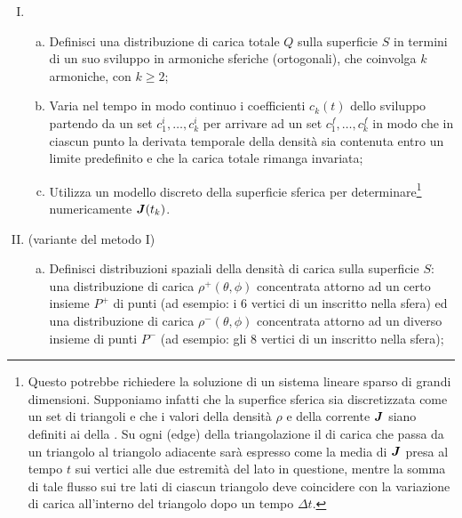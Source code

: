 \begin{enumerate}[(I)]
\item {} 
	\begin{enumerate}[(a)]
	\item Definisci una distribuzione di carica totale $Q$ sulla superficie $S$ in termini di un  suo sviluppo in armoniche sferiche (ortogonali), che coinvolga $k$ armoniche, con $k \geq 2$;  
	\item Varia nel tempo in modo continuo i coefficienti $c_k(t)$ dello sviluppo partendo da un set  $c^{i}_1, \ldots, c^{i}_k$ per arrivare ad un set  $c^{f}_1, \ldots, c^{f}_k$ in modo che in ciascun punto la derivata temporale della densità sia contenuta entro un limite predefinito e che la carica totale rimanga invariata;
	\item Utilizza un modello discreto della superficie sferica per determinare\footnote{Questo potrebbe richiedere la soluzione di un sistema lineare sparso di grandi dimensioni. Supponiamo infatti che la superfice sferica sia discretizzata come un set di triangoli e che i valori della densità $\rho$ e della corrente $\vb*{J}$ siano definiti ai  della . Su ogni  (edge) della triangolazione il  di carica che passa da un triangolo al triangolo adiacente sarà espresso come la media di $\vb*{J}$ presa al tempo $t$ sui vertici alle due estremità del lato in questione, mentre la somma di tale flusso sui tre lati di ciascun triangolo deve coincidere con la variazione di carica all'interno del triangolo dopo un tempo $\Delta t$.} numericamente $\vb*{J}(t_k)$.
	\end{enumerate}
\item {} (variante del metodo I) 
	\begin{enumerate}[(a)]
	\item Definisci  distribuzioni spaziali della densità di carica sulla superficie $S$: una distribuzione di carica  $\rho^+(\theta, \phi)$ concentrata attorno ad un certo insieme $P^+$ di punti (ad esempio: i $6$ vertici di un   inscritto nella sfera) ed una distribuzione di carica  $\rho^-(\theta, \phi)$ concentrata attorno ad un diverso insieme di punti $P^-$ (ad esempio: gli $8$ vertici di un   inscritto nella sfera);

\end{enumerate}
\end{enumerate}
